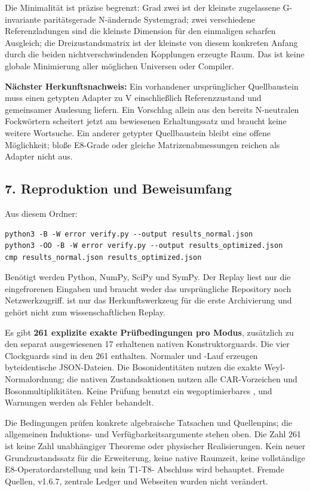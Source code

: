 Die Minimalität ist präzise begrenzt: Grad zwei ist der kleinste
zugelassene G-invariante paritätsgerade N-ändernde Systemgrad; zwei
verschiedene Referenzladungen sind die kleinste Dimension für den
einmaligen scharfen Ausgleich; die Dreizustandsmatrix ist der kleinste
von diesem konkreten Anfang durch die beiden nichtverschwindenden
Kopplungen erzeugte Raum. Das ist keine globale Minimierung aller
möglichen Universen oder Compiler.

\textbf{Nächster Herkunftsnachweis:} Ein vorhandener ursprünglicher
Quellbaustein muss einen getypten Adapter zu V einschließlich
Referenzzustand und gemeinsamer Auslesung liefern. Ein Vorschlag allein
aus den bereits N-neutralen Fockwörtern scheitert jetzt am bewiesenen
Erhaltungssatz und braucht keine weitere Wortsuche. Ein anderer getypter
Quellbaustein bleibt eine offene Möglichkeit; bloße E8-Grade oder
gleiche Matrizenabmessungen reichen als Adapter nicht aus.

\subsection{7. Reproduktion und
Beweisumfang}\label{reproduktion-und-beweisumfang}

Aus diesem Ordner:

\begin{verbatim}
python3 -B -W error verify.py --output results_normal.json
python3 -OO -B -W error verify.py --output results_optimized.json
cmp results_normal.json results_optimized.json
\end{verbatim}

Benötigt werden Python, NumPy, SciPy und SymPy. Der Replay liest nur die
eingefrorenen Eingaben und braucht weder das ursprüngliche Repository
noch Netzwerkzugriff.  ist nur das Herkunftswerkzeug
für die erste Archivierung und gehört nicht zum wissenschaftlichen
Replay.

Es gibt \textbf{261 explizite exakte Prüfbedingungen pro Modus},
zusätzlich zu den separat ausgewiesenen 17 erhaltenen nativen
Konstruktorguards. Die vier Clockguards sind in den 261 enthalten.
Normaler und -Lauf erzeugen byteidentische JSON-Dateien.
Die Bosonidentitäten nutzen die exakte Weyl- Normalordnung; die nativen
Zustandsaktionen nutzen alle CAR-Vorzeichen und Bosonmultiplikitäten.
Keine Prüfung benutzt ein wegoptimierbares , und
Warnungen werden als Fehler behandelt.

Die Bedingungen prüfen konkrete algebraische Tatsachen und Quellenpins;
die allgemeinen Induktions- und Verfügbarkeitsargumente stehen oben. Die
Zahl 261 ist keine Zahl unabhängiger Theoreme oder physischer
Realisierungen. Kein neuer Grundzustandssatz für die Erweiterung, keine
native Raumzeit, keine vollständige E8-Operatordarstellung und kein
T1-T8- Abschluss wird behauptet. Fremde Quellen, v1.6.7, zentrale Ledger
und Webseiten wurden nicht verändert.

